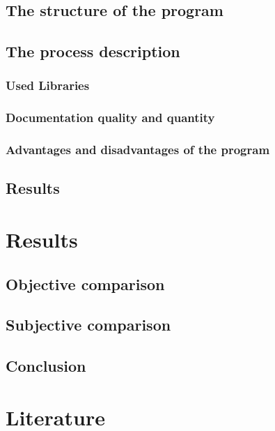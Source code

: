\documentclass{article}
\begin{document}
\subsection{The structure of the program}
\subsection{The process description}
\subsubsection{Used Libraries}
\subsubsection{Documentation quality and quantity}
\subsubsection{Advantages and disadvantages of the program}
\subsection{Results}

\newpage
\section{Results}
\subsection{Objective comparison}
\subsection{Subjective comparison}
\subsection{Conclusion}

\newpage
\section{Literature}
\end{document}
